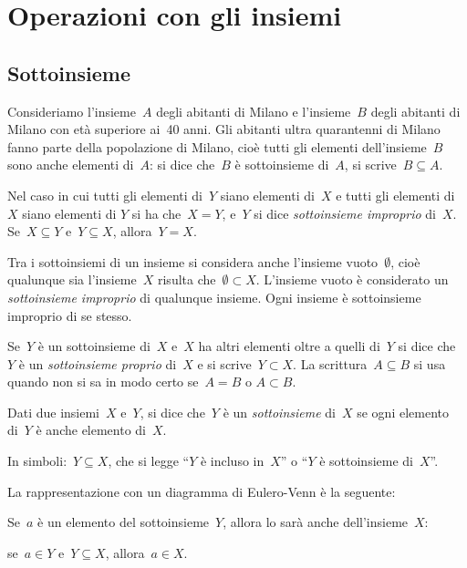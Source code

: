 

\section{Operazioni con gli insiemi}
\label{sec:insiemi_operazioni}

\subsection{Sottoinsieme}
\label{subsec:op_sottoinsieme}

Consideriamo l'insieme~\(A\) degli abitanti di Milano e l'insieme~\(B\) 
degli abitanti di Milano con età superiore ai~40 anni. Gli abitanti ultra 
quarantenni di Milano fanno parte della popolazione di Milano, cioè tutti 
gli elementi dell'insieme~\(B\) sono anche elementi di~\(A\): si dice 
che~\(B\) è sottoinsieme di~\(A\), si scrive~\(B\subseteq A\).

Nel caso in cui tutti gli elementi di~\(Y\) siano elementi di~\(X\) e tutti 
gli elementi di~\(X\) siano elementi di \(Y\) si ha che~\(X=Y\), e~\(Y\) si 
dice \emph{sottoinsieme improprio} di~\(X\).
Se~\(X\subseteq Y\) e~\(Y\subseteq X\), allora~\(Y=X\).

Tra i sottoinsiemi di un insieme si considera anche
l'insieme vuoto~\(\emptyset \), cioè qualunque sia l'insieme~\(X\) risulta 
che~\(\emptyset \subset X\).
L'insieme vuoto è considerato un \emph{sottoinsieme improprio} di qualunque 
insieme.
Ogni insieme è sottoinsieme improprio di se stesso.

Se~\(Y\) è un sottoinsieme di~\(X\) e~\(X\) ha altri elementi oltre a 
quelli di~\(Y\) si dice che~\(Y\) è un \emph{sottoinsieme proprio} di~\(X\) 
e si scrive~\(Y\subset X\).
La scrittura~\(A\subseteq B\) si usa quando non si sa in modo certo 
se~\(A=B\) o \(A\subset B\).

\begin{definizione}
Dati due insiemi~\(X\) e~\(Y\), si dice che~\(Y\) è un \emph{sottoinsieme} 
di~\(X\) se ogni elemento di~\(Y\) è anche elemento di~\(X\).

In simboli:~\(Y\subseteq X\), che si legge
``\(Y\) è incluso in~\(X\)'' o ``\(Y\) è sottoinsieme di~\(X\)''.
\end{definizione}

La rappresentazione con un diagramma di Eulero-Venn è la seguente:
\begin{center}

\end{center}
Se~\(a\) è un elemento del sottoinsieme~\(Y\), allora lo sarà anche 
dell'insieme~\(X\):
\begin{center}
se~\(a\in Y\) e~\(Y\subseteq X\), allora~\(a\in X\).
\end{center}

